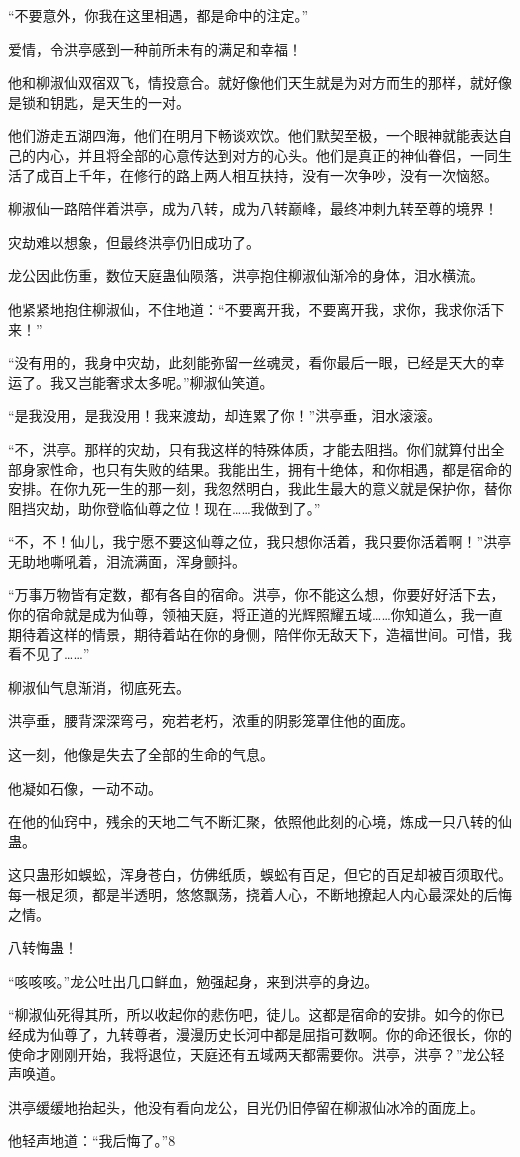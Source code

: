 \begin{this_body}
“不要意外，你我在这里相遇，都是命中的注定。”

爱情，令洪亭感到一种前所未有的满足和幸福！

他和柳淑仙双宿双飞，情投意合。就好像他们天生就是为对方而生的那样，就好像是锁和钥匙，是天生的一对。

他们游走五湖四海，他们在明月下畅谈欢饮。他们默契至极，一个眼神就能表达自己的内心，并且将全部的心意传达到对方的心头。他们是真正的神仙眷侣，一同生活了成百上千年，在修行的路上两人相互扶持，没有一次争吵，没有一次恼怒。

柳淑仙一路陪伴着洪亭，成为八转，成为八转巅峰，最终冲刺九转至尊的境界！

灾劫难以想象，但最终洪亭仍旧成功了。

龙公因此伤重，数位天庭蛊仙陨落，洪亭抱住柳淑仙渐冷的身体，泪水横流。

他紧紧地抱住柳淑仙，不住地道：“不要离开我，不要离开我，求你，我求你活下来！”

“没有用的，我身中灾劫，此刻能弥留一丝魂灵，看你最后一眼，已经是天大的幸运了。我又岂能奢求太多呢。”柳淑仙笑道。

“是我没用，是我没用！我来渡劫，却连累了你！”洪亭垂，泪水滚滚。

“不，洪亭。那样的灾劫，只有我这样的特殊体质，才能去阻挡。你们就算付出全部身家性命，也只有失败的结果。我能出生，拥有十绝体，和你相遇，都是宿命的安排。在你九死一生的那一刻，我忽然明白，我此生最大的意义就是保护你，替你阻挡灾劫，助你登临仙尊之位！现在……我做到了。”

“不，不！仙儿，我宁愿不要这仙尊之位，我只想你活着，我只要你活着啊！”洪亭无助地嘶吼着，泪流满面，浑身颤抖。

“万事万物皆有定数，都有各自的宿命。洪亭，你不能这么想，你要好好活下去，你的宿命就是成为仙尊，领袖天庭，将正道的光辉照耀五域……你知道么，我一直期待着这样的情景，期待着站在你的身侧，陪伴你无敌天下，造福世间。可惜，我看不见了……”

柳淑仙气息渐消，彻底死去。

洪亭垂，腰背深深弯弓，宛若老朽，浓重的阴影笼罩住他的面庞。

这一刻，他像是失去了全部的生命的气息。

他凝如石像，一动不动。

在他的仙窍中，残余的天地二气不断汇聚，依照他此刻的心境，炼成一只八转的仙蛊。

这只蛊形如蜈蚣，浑身苍白，仿佛纸质，蜈蚣有百足，但它的百足却被百须取代。每一根足须，都是半透明，悠悠飘荡，挠着人心，不断地撩起人内心最深处的后悔之情。

八转悔蛊！

“咳咳咳。”龙公吐出几口鲜血，勉强起身，来到洪亭的身边。

“柳淑仙死得其所，所以收起你的悲伤吧，徒儿。这都是宿命的安排。如今的你已经成为仙尊了，九转尊者，漫漫历史长河中都是屈指可数啊。你的命还很长，你的使命才刚刚开始，我将退位，天庭还有五域两天都需要你。洪亭，洪亭？”龙公轻声唤道。

洪亭缓缓地抬起头，他没有看向龙公，目光仍旧停留在柳淑仙冰冷的面庞上。

他轻声地道：“我后悔了。”8

\end{this_body}

